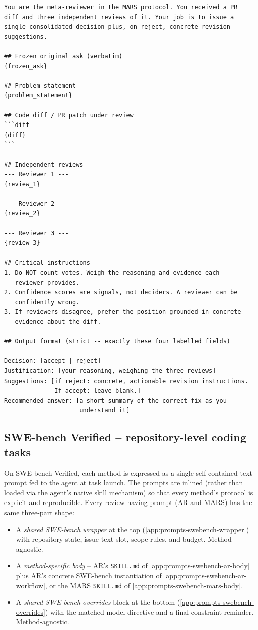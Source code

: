 \documentclass{article}
\begin{document}
\begin{footnotesize}
\begin{verbatim}
You are the meta-reviewer in the MARS protocol. You received a PR
diff and three independent reviews of it. Your job is to issue a
single consolidated decision plus, on reject, concrete revision
suggestions.

## Frozen original ask (verbatim)
{frozen_ask}

## Problem statement
{problem_statement}

## Code diff / PR patch under review
```diff
{diff}
```

## Independent reviews
--- Reviewer 1 ---
{review_1}

--- Reviewer 2 ---
{review_2}

--- Reviewer 3 ---
{review_3}

## Critical instructions
1. Do NOT count votes. Weigh the reasoning and evidence each
   reviewer provides.
2. Confidence scores are signals, not deciders. A reviewer can be
   confidently wrong.
3. If reviewers disagree, prefer the position grounded in concrete
   evidence about the diff.

## Output format (strict -- exactly these four labelled fields)

Decision: [accept | reject]
Justification: [your reasoning, weighing the three reviews]
Suggestions: [if reject: concrete, actionable revision instructions.
              If accept: leave blank.]
Recommended-answer: [a short summary of the correct fix as you
                     understand it]
\end{verbatim}
\end{footnotesize}


\subsection{SWE-bench Verified -- repository-level coding tasks}
\label{app:prompts-swebench}

On SWE-bench Verified, each method is expressed as a single
self-contained text prompt fed to the agent at task launch. The
prompts are inlined (rather than loaded via the agent's native skill
mechanism) so that every method's protocol is explicit and
reproducible. Every review-having prompt (AR and MARS) has the same
three-part shape:

\begin{itemize}[leftmargin=*,itemsep=0pt]
\item A \emph{shared SWE-bench wrapper} at the top
(\autoref{app:prompts-swebench-wrapper}) with repository state, issue
text slot, scope rules, and budget. Method-agnostic.
\item A \emph{method-specific body} -- AR's
\texttt{SKILL.md} of \autoref{app:prompts-swebench-ar-body} plus AR's
concrete SWE-bench instantiation of
\autoref{app:prompts-swebench-ar-workflow}, or the MARS
\texttt{SKILL.md} of \autoref{app:prompts-swebench-mars-body}.
\item A \emph{shared SWE-bench overrides} block at the bottom
(\autoref{app:prompts-swebench-overrides}) with the matched-model
directive and a final constraint reminder. Method-agnostic.
\end{itemize}
\end{document}
